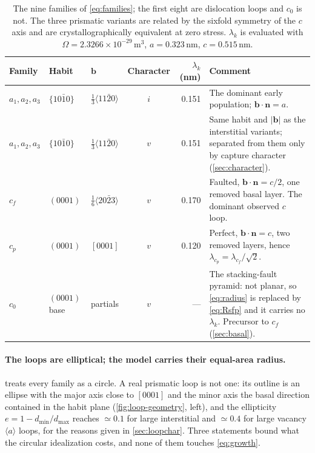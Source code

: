 \documentclass{article}
\newcommand{\aloop}{\ensuremath{\langle a\rangle}}
\newcommand{\bvec}{\bm b}
\newcommand{\nvec}{\bm n}
\begin{document}
\begin{table}[htbp]
\centering
\caption{The nine families of \cref{eq:families}; the first eight are
dislocation loops and $c_0$ is not. The three prismatic
variants are related by the sixfold symmetry of the $c$ axis and are
crystallographically equivalent at zero stress. $\lambda_k$ is evaluated with
$\Omega=2.3266\times10^{-29}\,$m$^3$, $a=0.323\,$nm, $c=0.515\,$nm.}
\label{tab:cd-families}
\begin{tabularx}{\textwidth}{@{}l l l c r X@{}}
\toprule
Family & Habit & $\bvec$ & Character & $\lambda_k$ (nm) & Comment \\
\midrule
$a_1,a_2,a_3$ & $\{10\bar10\}$ & $\tfrac13\langle11\bar20\rangle$ &
  $i$ & 0.151 & The dominant early population; $\bvec\!\cdot\!\nvec=a$. \\
$a_1,a_2,a_3$ & $\{10\bar10\}$ & $\tfrac13\langle11\bar20\rangle$ &
  $v$ & 0.151 & Same habit and $|\bvec|$ as the interstitial variants;
  separated from them only by capture character (\cref{sec:character}). \\
$c_f$ & $(0001)$ & $\tfrac16\langle20\bar23\rangle$ &
  $v$ & 0.170 & Faulted, $\bvec\!\cdot\!\nvec=c/2$, one removed basal layer.
  The dominant observed $c$ loop. \\
$c_p$ & $(0001)$ & $[0001]$ &
  $v$ & 0.120 & Perfect, $\bvec\!\cdot\!\nvec=c$, two removed layers, hence
  $\lambda_{c_p}=\lambda_{c_f}/\sqrt2$. \\
$c_0$ & $(0001)$ base & partials &
  $v$ & --- & The stacking-fault pyramid: not planar, so \cref{eq:radius} is
  replaced by \cref{eq:Rsfp} and it carries no $\lambda_k$. Precursor to $c_f$
  (\cref{sec:basal}). \\
\bottomrule
\end{tabularx}
\end{table}

\paragraph{The loops are elliptical; the model carries their equal-area radius.}
 treats every family as a circle. A real prismatic loop is not
one: its outline is an ellipse with the major axis close to $[0001]$ and the
minor axis the basal direction contained in the habit plane
(\cref{fig:loop-geometry}, left), and the ellipticity $e=1-d_{\min}/d_{\max}$
reaches $\simeq0.1$ for large interstitial and $\simeq0.4$ for large vacancy
\aloop{} loops, for the reasons given in \cref{sec:loopchar}. Three statements
bound what the circular idealization costs, and none of them touches
\cref{eq:growth}.
\end{document}
